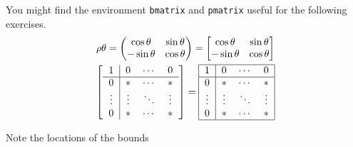\documentclass[a4paper]{article}
\begin{document}
	You might find the environment \texttt{bmatrix} and \texttt{pmatrix}
	useful for the following exercises.
	\begin{gather}
	\rho\theta = 
		\begin{pmatrix}
			\cos \theta & \sin \theta \\
			-\sin \theta & \cos \theta
		\end{pmatrix}
		=
		\begin{bmatrix}
			\cos \theta & \sin \theta \\
			-\sin \theta & \cos \theta
		\end{bmatrix}\\
	\begin{bmatrix}
	\begin{tabular}{c | c c c}
		1 & 0 & \text{$\cdots$} & 0\\
		\hline
		0 & \text{$\ast$} & \text{$\cdots$} & \text{$\ast$}\\
		\vdots & \vdots & \text{$\ddots$} & \vdots\\
		0 & \text{$\ast$} & \text{$\cdots$} & \text{$\ast$}
	\end{tabular}
	\end{bmatrix}
	=
	\begin{tabular}{|c | c c c|}
		\hline
		1 & 0 & \text{$\cdots$} & 0\\
		\hline
		0 & \text{$\ast$} & \text{$\cdots$} & \text{$\ast$}\\
		\vdots & \vdots & \text{$\ddots$} & \vdots\\
		0 & \text{$\ast$} & \text{$\cdots$} & \text{$\ast$}\\
		\hline
	\end{tabular}
	\end{gather}
	
	Note the locations of the bounds
\end{document}
